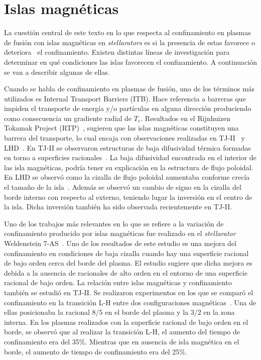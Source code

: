 \section{Islas magnéticas}
La cuestión central de este texto en lo que respecta al confinamiento en plasmas de fusión con
islas magnéticas en \textit{stellarators} es si la presencia de estas favorece o deteriora~\cite{Transport_1999} el confinamiento.
Existen distintas líneas de investigación para determinar en qué condiciones las islas
favorecen el confinamiento. A continuación se van a describir algunas de ellas.\par
Cuando se habla de confinamiento en plasmas de fusión, uno de los términos más utilizados
es Internal Transport Barriers (ITB). Hace referencia a barreras
que impiden el transporte de energía y/o partículas en alguna dirección produciendo como
consecuencia un gradiente radial de $T_e$.
Resultados en el Rijnhuizen Tokamak Project (RTP)~\cite{PhysRevLett.82.5048}, sugieren que las islas 
magnéticas constituyen una barrera
del transporte, lo cual encaja con observaciones realizadas en TJ-II~\cite{Castej_n_2004,Estrada_2003} y 
LHD~\cite{PhysRevLett.84.103}. 
En TJ-II se observaron estructuras de baja difusividad térmica formadas en torno a superficies
racionales~\cite{Vargas_2007,Estrada_2007}.
La baja difusividad encontrada en el interior de las isla magnéticas, podría tener su explicación 
en la estructura de flujo poloidal. En LHD se observó como la cizalla de flujo poloidal
aumentaba conforme crecía el tamaño de la isla~\cite{PhysRevLett.88.015002}. 
Además se observó un cambio de signo en
la cizalla del borde interno con respecto al externo, teniendo lugar la inversión en el centro de
la isla. Dicha inversión también ha sido observada recientemente en TJ-II.\par
Uno de los trabajos más relevantes en lo que se refiere a la variación de confinamiento
producido por islas magnéticas fue realizado en el \textit{stellarator} Weldenstein 7-AS~\cite{Brakel_2002}. 
Uno de los resultados de este estudio es una mejora del confinamiento en
condiciones de baja cizalla cuando hay una superficie racional de bajo orden cerca del borde
del plasma. El estudio sugiere que dicha mejora es debida a la ausencia de racionales de alto
orden en el entorno de una superficie racional de bajo orden.
La relación entre islas magnéticas y confinamiento también se estudió en TJ-II. Se realizaron
experimentos en los que se comparó el confinamiento en la transición L-H entre dos
configuraciones magnéticas~\cite{Estrada_2009}. 
Una de ellas posicionaba la racional $8/5$ en el borde del plasma
y la $3/2$ en la zona interna. En los plasmas realizados con la superficie racional de bajo
orden en el borde, se observó que al realizar la transición L-H, el aumento del tiempo de
confinamiento era del 35\%. Mientras que en ausencia de isla magnética en el borde, 
el aumento de tiempo de confinamiento era del 25\%.
